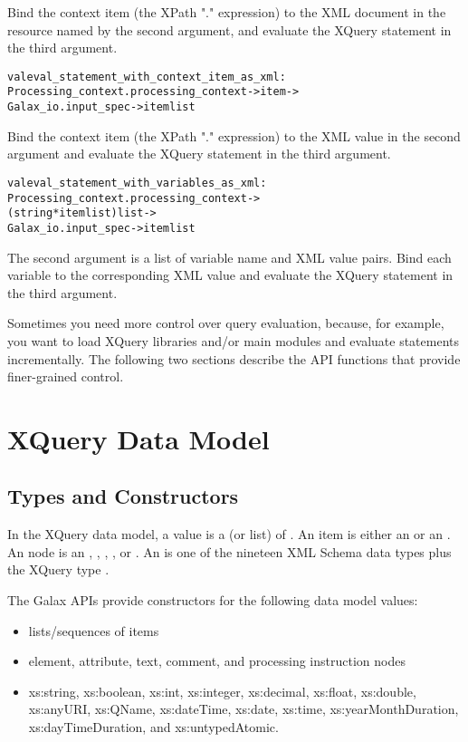     Bind the context item (the XPath "." expression) to the XML
    document in the resource named by the second argument, and
    evaluate the XQuery statement in the third argument.

\begin{alltt}
    val eval\_statement\_with\_context\_item\_as\_xml : 
      Processing\_context.processing\_context -> item -> 
        Galax\_io.input\_spec -> item list
\end{alltt}

    Bind the context item (the XPath "." expression) to the XML value
    in the second argument and evaluate the XQuery statement in
    the third argument. 
  
\begin{alltt}
  val eval\_statement\_with\_variables\_as\_xml : 
    Processing\_context.processing\_context -> 
      (string * item list) list -> 
        Galax\_io.input\_spec -> item list
\end{alltt}

    The second argument is a list of variable name and XML value pairs.
    Bind each variable to the corresponding XML value and evaluate the
    XQuery statement in the third argument.

  Sometimes you need more control over query evaluation, because, for
  example, you want to load XQuery libraries and/or main modules and
  evaluate statements incrementally.    The following two sections
  describe the API functions that provide finer-grained control.

\section{XQuery Data Model}

\subsection{Types and Constructors}

  In the XQuery data model, a value is a  (or list) of
  .  An item is either an  or an .  An
  node is an , , , , or
  .  An  is one of the nineteen
  XML Schema data types plus the XQuery type .

  The Galax APIs provide constructors for the following data model
  values: 
\begin{itemize}
\item lists/sequences of items
\item element, attribute, text, comment, and processing instruction
    nodes
\item xs:string, xs:boolean, xs:int, xs:integer, xs:decimal, xs:float,
    xs:double, xs:anyURI, xs:QName, xs:dateTime, xs:date, xs:time,
  xs:yearMonthDuration, xs:dayTimeDuration, and xs:untypedAtomic.
\end{itemize}

